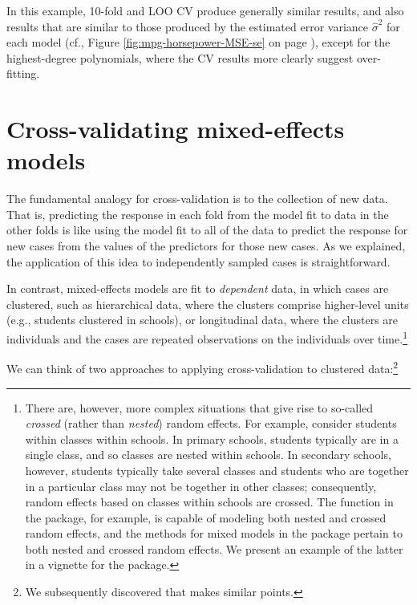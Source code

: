 \documentclass[
]{jss}
\begin{document}
In this example, 10-fold and LOO CV produce generally similar results,
and also results that are similar to those produced by the estimated
error variance \(\widehat{\sigma}^2\) for each model (cf., Figure
\ref{fig:mpg-horsepower-MSE-se} on page
\pageref{fig:mpg-horsepower-MSE-se}), except for the highest-degree
polynomials, where the CV results more clearly suggest over-fitting.

\section{Cross-validating mixed-effects
models}\label{cross-validating-mixed-effects-models}

The fundamental analogy for cross-validation is to the collection of new
data. That is, predicting the response in each fold from the model fit
to data in the other folds is like using the model fit to all of the
data to predict the response for new cases from the values of the
predictors for those new cases. As we explained, the application of this
idea to independently sampled cases is straightforward.

In contrast, mixed-effects models are fit to \emph{dependent} data, in
which cases are clustered, such as hierarchical data, where the clusters
comprise higher-level units (e.g., students clustered in schools), or
longitudinal data, where the clusters are individuals and the cases are
repeated observations on the individuals over time.\footnote{There are,
  however, more complex situations that give rise to so-called
  \emph{crossed} (rather than \emph{nested}) random effects. For
  example, consider students within classes within schools. In primary
  schools, students typically are in a single class, and so classes are
  nested within schools. In secondary schools, however, students
  typically take several classes and students who are together in a
  particular class may not be together in other classes; consequently,
  random effects based on classes within schools are crossed. The
   function in the  package, for example, is
  capable of modeling both nested and crossed random effects, and the
   methods for mixed models in the  package pertain
  to both nested and crossed random effects. We present an example of
  the latter in a vignette for the  package.}

We can think of two approaches to applying cross-validation to clustered
data:\footnote{We subsequently discovered that \citet[Section
  8]{Vehtari:2023} makes similar points.}
\end{document}
